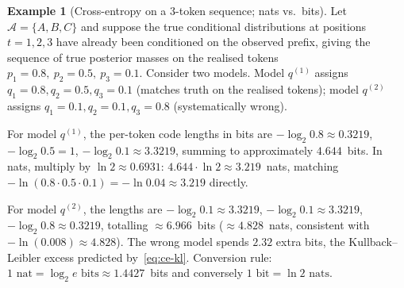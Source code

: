 \documentclass[12pt,a4paper]{article}
\theoremstyle{plain}
\theoremstyle{definition}
\newtheorem{example}[theorem]{Example}
\begin{document}
\begin{example}[Cross-entropy on a 3-token sequence; nats vs.\ bits]
\label{ex:ce3}
Let $\mathcal{A} = \{A,B,C\}$ and suppose the true conditional
distributions at positions $t=1,2,3$ have already been conditioned on
the observed prefix, giving the sequence of true posterior masses on
the realised tokens $p_1 = 0.8,\ p_2 = 0.5,\ p_3 = 0.1$.  Consider
two models.  Model $q^{(1)}$ assigns $q_1 = 0.8, q_2 = 0.5,
q_3 = 0.1$ (matches truth on the realised tokens); model $q^{(2)}$
assigns $q_1 = 0.1, q_2 = 0.1, q_3 = 0.8$ (systematically wrong).

For model $q^{(1)}$, the per-token code lengths in bits are
$-\log_2 0.8 \approx 0.3219$, $-\log_2 0.5 = 1$,
$-\log_2 0.1 \approx 3.3219$, summing to approximately $4.644$~bits.
In nats, multiply by $\ln 2 \approx 0.6931$: $4.644 \cdot \ln 2
\approx 3.219$~nats, matching $-\ln(0.8 \cdot 0.5 \cdot 0.1) =
-\ln 0.04 \approx 3.219$ directly.

For model $q^{(2)}$, the lengths are $-\log_2 0.1 \approx 3.3219$,
$-\log_2 0.1 \approx 3.3219$, $-\log_2 0.8 \approx 0.3219$, totalling
$\approx 6.966$~bits ($\approx 4.828$~nats, consistent with
$-\ln(0.008) \approx 4.828$).  The wrong model spends $2.32$ extra
bits, the Kullback--Leibler excess predicted by~\eqref{eq:ce-kl}.
Conversion rule: $1\text{ nat} = \log_2 e \text{ bits} \approx
1.4427$~bits and conversely $1\text{ bit} = \ln 2 \text{ nats}$.
\end{example}


\end{document}
